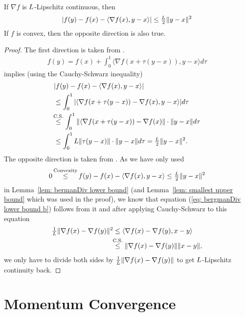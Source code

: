 \begin{lemma}
	\label{Appdx-lem: Lipschitz Gradient implies taylor inequality}
	If \(\nabla f\) is \(L\)-Lipschitz continuous, then
	\begin{align*}
		|f(y) - f(x) - \langle \nabla f(x), y-x\rangle | \le \tfrac{L}2 \|y-x\|^2
	\end{align*}
	If \(f\) is convex, then the opposite direction is also true.
\end{lemma}
\begin{proof}
	The first direction is taken from \textcite[Lemma
	1.2.3]{nesterovLecturesConvexOptimization2018}.
 \begin{align*}
		f(y) = f(x) + \int_0^1\langle\nabla f(x+\tau(y-x)), y-x \rangle d\tau
	\end{align*}
	implies (using the  Cauchy-Schwarz inequality)
	\begin{align*}
		&| f(y) - f(x) - \langle \nabla f(x), y-x\rangle | \\
		&\le \int_0^1 | \langle\nabla f(x+\tau(y-x))-\nabla f(x), y-x\rangle | d\tau \\
		&\lxle{\text{C.S.}}
		\int_0^1 \|\langle\nabla f(x+\tau(y-x))-\nabla f(x)\| \cdot \|y-x\| d\tau\\
		&\le \int_0^1 \ubound \|\tau(y-x)\|\cdot\|y-x\| d\tau
		= \tfrac{\ubound}2 \|y-x\|^2.
		\qedhere
	\end{align*}
	The opposite direction is taken from \textcite[Lemma
	2.1.5]{nesterovLecturesConvexOptimization2018}.
	As we have only used
	\begin{align*}
		0\xle{\text{Convexity}} f(y) - f(x) - \langle \nabla f(x), y-x\rangle
		\le \tfrac{\ubound}2 \|y-x\|^2
	\end{align*}	
	in Lemma~\ref{lem: bermanDiv lower bound} (and Lemma~\ref{lem: smallest upper
	bound} which was used in the proof), we know that equation (\ref{eq:
	bergmanDiv lower bound b}) follows from it and after applying Cauchy-Schwarz
	to this equation
	\begin{align*}
		\tfrac{1}\ubound \|\nabla f(x)-\nabla f(y)\|^2
		&\le \langle \nabla f(x) - \nabla f(y), x-y\rangle \\
		&\lxle{\text{C.S.}} \|\nabla f(x) - \nabla f(y)\| \|x-y\|,
	\end{align*}
	we only have to divide both sides by \(\tfrac{1}{L} \|\nabla f(x)-\nabla
	f(y)\|\) to get \(L\)-Lipschitz continuity back.
\end{proof}

\section{Momentum Convergence}

